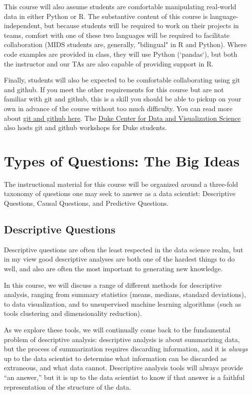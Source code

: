 \documentclass[12pt]{article}
\begin{document}
This course will also assume students are comfortable manipulating real-world data in either Python or R. The substantive content of this course is language-independent, but because students will be required to work on their projects in teams, comfort with one of these two languages will be required to facilitate collaboration (MIDS students are, generally, "bilingual" in R and Python). Where code examples are provided in class, they will use Python (`pandas`), but both the instructor and our TAs are also capable of providing support in R.

Finally, students will also be expected to be comfortable collaborating using git and github. If you meet the other requirements for this course but are not familiar with git and github, this is a skill you should be able to pickup on your own in advance of the course without too much difficulty. You can read more about \href{https://www.practicaldatascience.org/html/git_and_github.html}{git and github here}. The \href{https://library.duke.edu/data/}{Duke Center for Data and Visualization Science} also hosts git and github workshops for Duke students.


\section{Types of Questions: The Big Ideas}

The instructional material for this course will be organized around a three-fold taxonomy of questions one may seek to answer as a data scientist: Descriptive Questions, Causal Questions, and Predictive Questions.

\subsection{Descriptive Questions}

Descriptive questions are often the least respected in the data science realm, but in my view good descriptive analyses are both one of the hardest things to do well, and also are often the most important to generating new knowledge.

In this course, we will discuss a range of different methods for descriptive analysis, ranging from summary statistics (means, medians, standard deviations), to data visualization, and to unsupervised machine learning algorithms (such as tools clustering and dimensionality reduction).

As we explore these tools, we will continually come back to the fundamental problem of descriptive analysis: descriptive analysis is about summarizing data, but the process of summarization requires discarding information, and it is \emph{always} up to the data scientist to determine what information can be discarded as extraneous, and what data cannot. Descriptive analysis tools will always provide ``an answer,'' but it is up to the data scientist to know if that answer is a faithful representation of the structure of the data.
\end{document}
